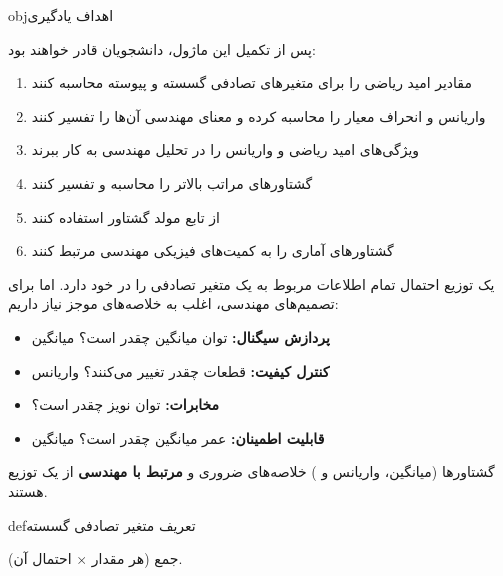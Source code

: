 \begin{PSbox}[unbreakable]{obj}{اهداف یادگیری}

پس از تکمیل این ماژول، دانشجویان قادر خواهند بود:

\begin{enumerate}
\def\labelenumi{\arabic{enumi}.}
\tightlist
\item
  مقادیر امید ریاضی را برای متغیرهای تصادفی گسسته و پیوسته محاسبه کنند
\item
  واریانس و انحراف معیار را محاسبه کرده و معنای مهندسی آن‌ها را تفسیر کنند
\item
  ویژگی‌های امید ریاضی و واریانس را در تحلیل مهندسی به کار ببرند
\item
  گشتاورهای مراتب بالاتر را محاسبه و تفسیر کنند
\item
  از تابع مولد گشتاور  استفاده کنند
\item
  گشتاورهای آماری را به کمیت‌های فیزیکی مهندسی مرتبط کنند
\end{enumerate}

\end{PSbox}



یک توزیع احتمال تمام اطلاعات مربوط به یک متغیر تصادفی را در خود دارد. اما برای تصمیم‌های مهندسی، اغلب به خلاصه‌های موجز نیاز داریم:

\begin{itemize}
\tightlist
\item
  \textbf{پردازش سیگنال:} توان میانگین چقدر است؟ \lr{\mbox{\ensuremath{\to}}} میانگین 
\item
  \textbf{کنترل کیفیت:} قطعات چقدر تغییر می‌کنند؟ \lr{\mbox{\ensuremath{\to}}} واریانس
\item
  \textbf{مخابرات:} توان نویز چقدر است؟ 
\item
  \textbf{قابلیت اطمینان:} عمر میانگین چقدر است؟ \lr{\mbox{\ensuremath{\to}}} میانگین
\end{itemize}

گشتاورها (میانگین، واریانس و ) خلاصه‌های ضروری و \textbf{مرتبط با مهندسی} از یک توزیع هستند.


\begin{PSbox}[unbreakable]{def}{تعریف  متغیر تصادفی گسسته}


جمع (هر مقدار \ensuremath{\times} احتمال آن).

\end{PSbox}

